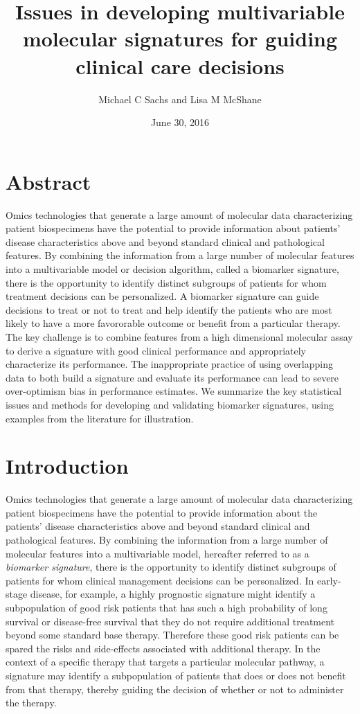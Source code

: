 \documentclass[11pt,]{article}
\title{Issues in developing multivariable molecular signatures for guiding
clinical care decisions}
\author{Michael C Sachs and Lisa M McShane}
\date{June 30, 2016}
\begin{document}
\maketitle

\section{Abstract}\label{abstract}

Omics technologies that generate a large amount of molecular data
characterizing patient biospecimens have the potential to provide
information about patients' disease characteristics above and beyond
standard clinical and pathological features. By combining the
information from a large number of molecular features into a
multivariable model or decision algorithm, called a biomarker signature,
there is the opportunity to identify distinct subgroups of patients for
whom treatment decisions can be personalized. A biomarker signature can
guide decisions to treat or not to treat and help identify the patients
who are most likely to have a more favororable outcome or benefit from a
particular therapy. The key challenge is to combine features from a high
dimensional molecular assay to derive a signature with good clinical
performance and appropriately characterize its performance. The
inappropriate practice of using overlapping data to both build a
signature and evaluate its performance can lead to severe over-optimism
bias in performance estimates. We summarize the key statistical issues
and methods for developing and validating biomarker signatures, using
examples from the literature for illustration.

\section{Introduction}\label{introduction}

Omics technologies that generate a large amount of molecular data
characterizing patient biospecimens have the potential to provide
information about the patients' disease characteristics above and beyond
standard clinical and pathological features. By combining the
information from a large number of molecular features into a
multivariable model, hereafter referred to as a \emph{biomarker
signature}, there is the opportunity to identify distinct subgroups of
patients for whom clinical management decisions can be personalized. In
early-stage disease, for example, a highly prognostic signature might
identify a subpopulation of good risk patients that has such a high
probability of long survival or disease-free survival that they do not
require additional treatment beyond some standard base therapy.
Therefore these good risk patients can be spared the risks and
side-effects associated with additional therapy. In the context of a
specific therapy that targets a particular molecular pathway, a
signature may identify a subpopulation of patients that does or does not
benefit from that therapy, thereby guiding the decision of whether or
not to administer the therapy.
\end{document}
